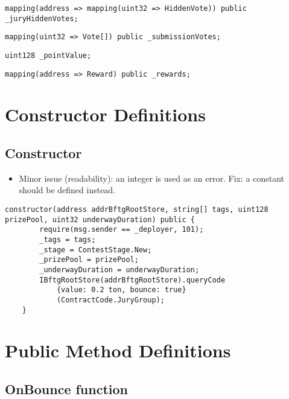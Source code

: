 \begin{lstlisting}[firstnumber=132]
    mapping(address => mapping(uint32 => HiddenVote)) public _juryHiddenVotes;
\end{lstlisting}

\begin{lstlisting}[firstnumber=153]
    mapping(uint32 => Vote[]) public _submissionVotes;
\end{lstlisting}

\begin{lstlisting}[firstnumber=171]
    uint128 _pointValue;
\end{lstlisting}

\begin{lstlisting}[firstnumber=173]
    mapping(address => Reward) public _rewards;
\end{lstlisting}

\section{Constructor Definitions}


\subsection{Constructor}

\begin{itemize}
\item Minor issue (readability): an integer is used as an error. Fix:
  a constant should be defined instead.
\end{itemize}

\begin{lstlisting}[firstnumber=34]
    constructor(address addrBftgRootStore, string[] tags, uint128 prizePool, uint32 underwayDuration) public {
        require(msg.sender == _deployer, 101);
        _tags = tags;
        _stage = ContestStage.New;
        _prizePool = prizePool;
        _underwayDuration = underwayDuration;
        IBftgRootStore(addrBftgRootStore).queryCode
            {value: 0.2 ton, bounce: true}
            (ContractCode.JuryGroup);
    }
\end{lstlisting}

\section{Public Method Definitions}


\subsection{OnBounce function}

